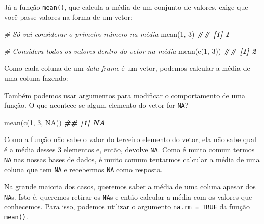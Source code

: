 \documentclass[
]{book}
\newenvironment{Shaded}{\begin{snugshade}}{\end{snugshade}}
\newcommand{\CommentTok}[1]{\textcolor[rgb]{0.56,0.35,0.01}{\textit{#1}}}
\newcommand{\ConstantTok}[1]{\textcolor[rgb]{0.00,0.00,0.00}{#1}}
\newcommand{\DecValTok}[1]{\textcolor[rgb]{0.00,0.00,0.81}{#1}}
\newcommand{\DocumentationTok}[1]{\textcolor[rgb]{0.56,0.35,0.01}{\textbf{\textit{#1}}}}
\newcommand{\FunctionTok}[1]{\textcolor[rgb]{0.00,0.00,0.00}{#1}}
\newcommand{\NormalTok}[1]{#1}
\newcommand{\SpecialCharTok}[1]{\textcolor[rgb]{0.00,0.00,0.00}{#1}}
\begin{document}
Já a função \texttt{mean()}, que calcula a média de um conjunto de valores, exige que você passe valores na forma de um vetor:

\begin{Shaded}
\begin{Highlighting}[]
\CommentTok{\# Só vai considerar o primeiro número na média}
\FunctionTok{mean}\NormalTok{(}\DecValTok{1}\NormalTok{, }\DecValTok{3}\NormalTok{)}
\DocumentationTok{\#\# [1] 1}

\CommentTok{\# Considera todos os valores dentro do vetor na média}
\FunctionTok{mean}\NormalTok{(}\FunctionTok{c}\NormalTok{(}\DecValTok{1}\NormalTok{, }\DecValTok{3}\NormalTok{))}
\DocumentationTok{\#\# [1] 2}
\end{Highlighting}
\end{Shaded}

Como cada coluna de um \emph{data frame} é um vetor, podemos calcular a média de uma coluna fazendo:

\begin{Shaded}
\end{Shaded}

Também podemos usar argumentos para modificar o comportamento de uma função. O que acontece se algum elemento do vetor for \texttt{NA}?

\begin{Shaded}
\begin{Highlighting}[]
\FunctionTok{mean}\NormalTok{(}\FunctionTok{c}\NormalTok{(}\DecValTok{1}\NormalTok{, }\DecValTok{3}\NormalTok{, }\ConstantTok{NA}\NormalTok{))}
\DocumentationTok{\#\# [1] NA}
\end{Highlighting}
\end{Shaded}

Como a função não sabe o valor do terceiro elemento do vetor, ela não sabe qual é a média desses 3 elementos e, então, devolve \texttt{NA}. Como é muito comum termos \texttt{NA} nas nossas bases de dados, é muito comum tentarmos calcular a média de uma coluna que tem \texttt{NA} e recebermos \texttt{NA} como resposta.

Na grande maioria dos casos, queremos saber a média de uma coluna apesar dos \texttt{NA}s. Isto é, queremos retirar os \texttt{NA}s e então calcular a média com os valores que conhecemos. Para isso, podemos utilizar o argumento \texttt{na.rm\ =\ TRUE} da função \texttt{mean()}.
\end{document}
